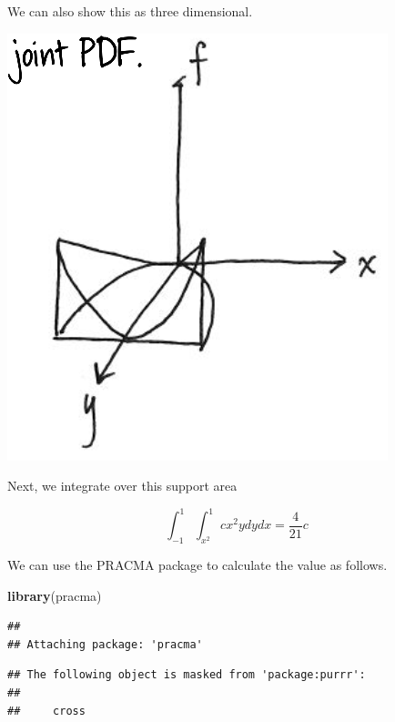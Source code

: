 \documentclass[]{book}
\newenvironment{Shaded}{\begin{snugshade}}{\end{snugshade}}
\newcommand{\KeywordTok}[1]{\textcolor[rgb]{0.13,0.29,0.53}{\textbf{#1}}}
\newcommand{\DecValTok}[1]{\textcolor[rgb]{0.00,0.00,0.81}{#1}}
\newcommand{\StringTok}[1]{\textcolor[rgb]{0.31,0.60,0.02}{#1}}
\newcommand{\ControlFlowTok}[1]{\textcolor[rgb]{0.13,0.29,0.53}{\textbf{#1}}}
\newcommand{\OperatorTok}[1]{\textcolor[rgb]{0.81,0.36,0.00}{\textbf{#1}}}
\newcommand{\NormalTok}[1]{#1}
\theoremstyle{definition}
\theoremstyle{definition}
\theoremstyle{definition}
\theoremstyle{remark}
\begin{document}
We can also show this as three dimensional.

\includegraphics[width=1\linewidth]{images/jointsupport3D}

Next, we integrate over this support area

\[∫_{-1}^{1}∫_{x^2}^{1}cx^2ydydx = \frac{4}{21} c\]

We can use the PRACMA package to calculate the value as follows.

\begin{Shaded}
\begin{Highlighting}[]
\KeywordTok{library}\NormalTok{(pracma)}
\end{Highlighting}
\end{Shaded}

\begin{verbatim}
## 
## Attaching package: 'pracma'
\end{verbatim}

\begin{verbatim}
## The following object is masked from 'package:purrr':
## 
##     cross
\end{verbatim}

\begin{Shaded}
\end{Shaded}
\end{document}

